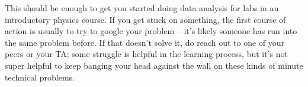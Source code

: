\documentclass[10pt]{article}
\begin{document}
This should be enough to get you started doing data analysis for labs in an introductory physics course. If you get stuck on something, the first course of action is usually to try to google your problem -- it's likely someone has run into the same problem before. If that doesn't solve it, do reach out to one of your peers or your TA; some struggle is helpful in the learning process, but it's not super helpful to keep banging your head against the wall on these kinds of minute technical problems. 
\end{document}
